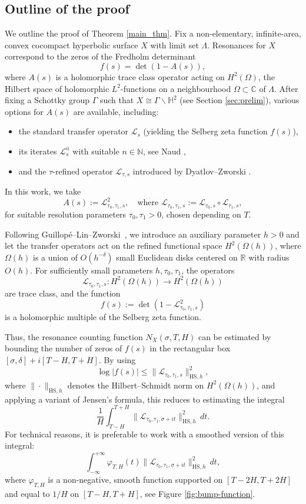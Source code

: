\documentclass[12pt,letterpaper]{amsart}
\theoremstyle{plain}
\theoremstyle{definition}
\theoremstyle{remark}
\newcommand{\HH}{\mathbb{H}}
\newcommand{\CC}{\mathbb{C}}
\begin{document}
\subsection{Outline of the proof}\label{sec:outline} 
We outline the proof of Theorem \ref{main_thm}. Fix a non-elementary, infinite-area, convex cocompact hyperbolic surface $X$ with limit set $\Lambda$. Resonances for $X$ correspond to the zeros of the Fredholm determinant
$$
f(s) = \det(1 - A(s)),
$$
where $A(s)$ is a holomorphic trace class operator acting on $H^2(\Omega)$, the Hilbert space of holomorphic $L^2$-functions on a neighbourhood $\Omega \subset \CC$ of $\Lambda$. After fixing a Schottky group $\Gamma$ such that $X \cong \Gamma \backslash \HH^2$ (see Section \ref{sec:prelim}), various options for $A(s)$ are available, including:
\begin{itemize}
\item the standard transfer operator $\mathcal{L}_s$ (yielding the Selberg zeta function $f(s)$),
\item its iterates $\mathcal{L}_s^n$ with suitable $n\in \mathbb{N}$, see Naud \cite{Naud14},
\item and the $\tau$-refined operator $\mathcal{L}_{\tau,s}$ introduced by Dyatlov–Zworski \cite{DyZw18}.
\end{itemize}
In this work, we take
$$
A(s) := \mathcal{L}_{\tau_0,\tau_1,s}^2, \quad \text{where } \mathcal{L}_{\tau_0,\tau_1,s} := \mathcal{L}_{\tau_0,s} \circ \mathcal{L}_{\tau_1,s},
$$
for suitable resolution parameters $\tau_0, \tau_1 > 0$, chosen depending on $T$.

Following Guillopé--Lin--Zworski~\cite{GLZ}, we introduce an auxiliary parameter $h > 0$ and let the transfer operators act on the refined functional space $H^2(\Omega(h))$, where $\Omega(h)$ is a union of $O(h^{-\delta})$ small Euclidean disks centered on $\mathbb{R}$ with radius $O(h)$. For sufficiently small parameters $h, \tau_0, \tau_1$, the operators
\[
\mathcal{L}_{\tau_0,\tau_1,s} \colon H^2(\Omega(h)) \to H^2(\Omega(h))
\]
are trace class, and the function
\[
f(s) := \det(1 - \mathcal{L}_{\tau_0,\tau_1,s}^2)
\]
is a holomorphic multiple of the Selberg zeta function.

Thus, the resonance counting function $N_X(\sigma, T, H)$ can be estimated by bounding the number of zeros of $f(s)$ in the rectangular box $[\sigma, \delta] + i[T-H, T+H]$. By using
\[
\log |f(s)| \le \| \mathcal{L}_{\tau_0,\tau_1,s} \|_{\mathrm{HS}, h}^2,
\]
where $\| \cdot \|_{\mathrm{HS}, h}$ denotes the Hilbert--Schmidt norm on $H^2(\Omega(h))$, and applying a variant of Jensen’s formula, this reduces to estimating the integral
\[
\frac{1}{H}\int_{T-H}^{T+H} \| \mathcal{L}_{\tau_0,\tau_1,\sigma + it} \|_{\mathrm{HS}, h}^2 \, dt.
\]
For technical reasons, it is preferable to work with a smoothed version of this integral:
\[
\int_{-\infty}^{+\infty} \varphi_{T,H}(t) \| \mathcal{L}_{\tau_0,\tau_1,\sigma + it} \|_{\mathrm{HS}, h}^2 \, dt,
\]
where $\varphi_{T,H}$ is a non-negative, smooth function supported on $[T-2H, T+2H]$ and equal to $1/H$ on $[T-H, T+H]$, see Figure \ref{fig:bump-function}.
\end{document}
